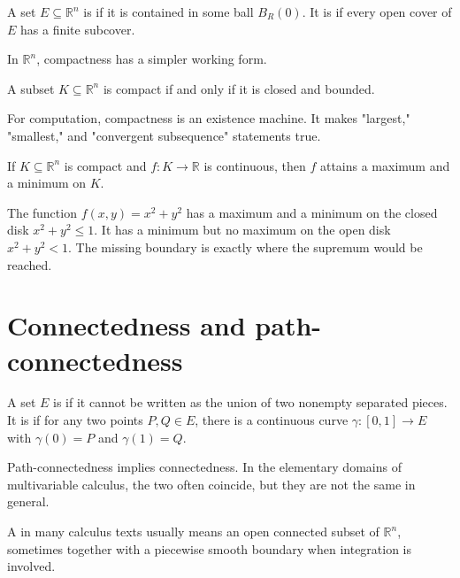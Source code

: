 \begin{definition}
A set \(E\subseteq\mathbb R^n\) is  if it is contained in some ball \(B_R(0)\).  It is  if every open cover of \(E\) has a finite subcover.
\end{definition}

In \(\mathbb R^n\), compactness has a simpler working form.

\begin{theorem}
A subset \(K\subseteq\mathbb R^n\) is compact if and only if it is closed and bounded.
\end{theorem}

For computation, compactness is an existence machine.  It makes "largest," "smallest," and "convergent subsequence" statements true.

\begin{theorem}
If \(K\subseteq\mathbb R^n\) is compact and \(f:K\to\mathbb R\) is continuous, then \(f\) attains a maximum and a minimum on \(K\).
\end{theorem}

\begin{example}
The function \(f(x,y)=x^2+y^2\) has a maximum and a minimum on the closed disk \(x^2+y^2\le1\).  It has a minimum but no maximum on the open disk \(x^2+y^2<1\).  The missing boundary is exactly where the supremum would be reached.
\end{example}

\section{Connectedness and path-connectedness}

\begin{definition}
A set \(E\) is  if it cannot be written as the union of two nonempty separated pieces.  It is  if for any two points \(P,Q\in E\), there is a continuous curve \(\gamma:[0,1]\to E\) with \(\gamma(0)=P\) and \(\gamma(1)=Q\).
\end{definition}

Path-connectedness implies connectedness.  In the elementary domains of multivariable calculus, the two often coincide, but they are not the same in general.

A  in many calculus texts usually means an open connected subset of \(\mathbb R^n\), sometimes together with a piecewise smooth boundary when integration is involved.

